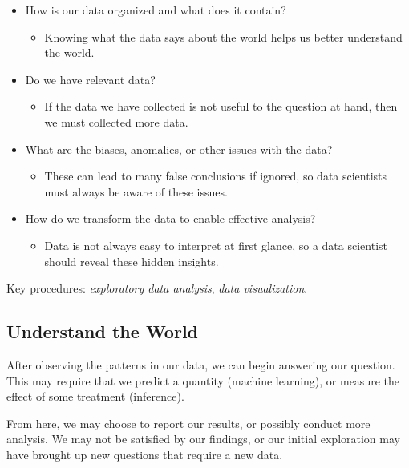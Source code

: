 \documentclass[
  letterpaper,
  DIV=11,
  numbers=noendperiod]{scrreprt}
\providecommand{\tightlist}{%
  \setlength{\itemsep}{0pt}\setlength{\parskip}{0pt}}\usepackage{longtable,booktabs,array}
\begin{document}
\begin{itemize}
\tightlist
\item
  How is our data organized and what does it contain?

  \begin{itemize}
  \tightlist
  \item
    Knowing what the data says about the world helps us better
    understand the world.
  \end{itemize}
\item
  Do we have relevant data?

  \begin{itemize}
  \tightlist
  \item
    If the data we have collected is not useful to the question at hand,
    then we must collected more data.
  \end{itemize}
\item
  What are the biases, anomalies, or other issues with the data?

  \begin{itemize}
  \tightlist
  \item
    These can lead to many false conclusions if ignored, so data
    scientists must always be aware of these issues.
  \end{itemize}
\item
  How do we transform the data to enable effective analysis?

  \begin{itemize}
  \tightlist
  \item
    Data is not always easy to interpret at first glance, so a data
    scientist should reveal these hidden insights.
  \end{itemize}
\end{itemize}

Key procedures: \emph{exploratory data analysis}, \emph{data
visualization}.

\hypertarget{understand-the-world}{%
\subsection{Understand the World}\label{understand-the-world}}

After observing the patterns in our data, we can begin answering our
question. This may require that we predict a quantity (machine
learning), or measure the effect of some treatment (inference).

From here, we may choose to report our results, or possibly conduct more
analysis. We may not be satisfied by our findings, or our initial
exploration may have brought up new questions that require a new data.
\end{document}
